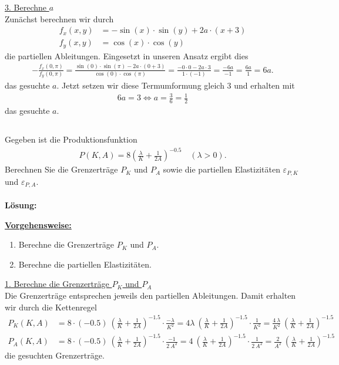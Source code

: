 \underline{3. Berechne $a$}\\
Zunächst berechnen wir durch
\begin{align*}
f_x(x,y) &= -\sin(x) \cdot \sin(y) + 2a \cdot (x+3) \\
f_y(x,y) &= \cos(x) \cdot \cos(y)
\end{align*}
die partiellen Ableitungen.
Eingesetzt in unseren Ansatz ergibt dies
\begin{align*}
-\frac{f_x(0,\pi)}{f_y(0,\pi)}
= 
\frac{\sin(0)\cdot \sin(\pi)-2a \cdot(0+3)}{\cos(0) \cdot \cos(\pi)}
= 
\frac{-0 \cdot 0 - 2a\cdot 3}{1 \cdot (-1)}
=
\frac{-6a}{-1}
= \frac{6a}{1} = 6a.
\end{align*}
das gesuchte $a$.
Jetzt setzen wir diese Termumformung gleich $3$ und erhalten mit
\begin{align*}
6a = 3 \Leftrightarrow a = \frac{3}{6} = \frac{1}{2}
\end{align*}
das gesuchte $a$.
\newpage

\subsection*{}
Gegeben ist die Produktionsfunktion
\begin{align*}
P(K,A)= 
8  \left( \frac{\lambda}{K} +\frac{1}{2A} \right)^{-0.5}
\quad ( \lambda >0 ).
\end{align*}
Berechnen Sie die Grenzerträge $P_K$ und $P_A$
sowie die partiellen Elastizitäten 
$\varepsilon_{P,K}$ und $\varepsilon_{P,A}$.
\\
\\ 
\textbf{Lösung:}
\begin{mdframed}
\underline{\textbf{Vorgehensweise:}}
\begin{enumerate}
\item Berechne die Grenzerträge $P_K$ und $P_A$.
\item Berechne die partiellen Elastizitäten.
\end{enumerate}
\end{mdframed}

\underline{1. Berechne die Grenzerträge $P_K$ und $P_A$}\\
Die Grenzerträge entsprechen jeweils den partiellen Ableitungen.
Damit erhalten wir durch die Kettenregel
\begin{align*}
P_K(K,A)
&= 8 \cdot (-0.5) \ \left( \frac{\lambda}{K} +\frac{1}{2A} \right)^{-1.5} \cdot \frac{-\lambda}{K^2}
= 4 \lambda \  \left( \frac{\lambda}{K} +\frac{1}{2A} \right)^{-1.5} \cdot \frac{1}{K^2}
= \frac{4 \ \lambda}{K^2} \  \left( \frac{\lambda}{K} +\frac{1}{2A} \right)^{-1.5}\\ 
P_A(K,A) &= 8 \cdot (-0.5) \ \left( \frac{\lambda}{K} +\frac{1}{2A} \right)^{-1.5}
\cdot \frac{-1}{2 \ A^2}
= 4 \ \left( \frac{\lambda}{K} +\frac{1}{2A} \right)^{-1.5}
\cdot \frac{1}{2 \ A^2}
= \frac{2}{ A^2} \ \left( \frac{\lambda}{K} +\frac{1}{2A} \right)^{-1.5}
\end{align*}
die gesuchten Grenzerträge.\\
\\

